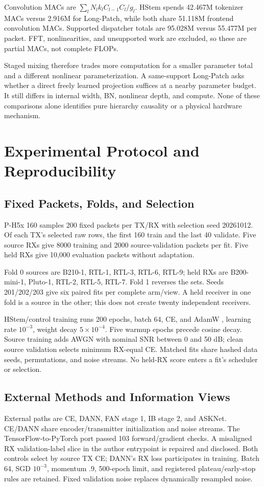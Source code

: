 \documentclass[journal]{IEEEtran}
\begin{document}
Convolution MACs are $\sum_lN_lk_lC_{l-1}C_l/g_l$. HStem spends 42.467M tokenizer MACs versus 2.916M for Long-Patch, while both share 51.118M frontend convolution MACs. Supported dispatcher totals are 95.028M versus 55.477M per packet. FFT, nonlinearities, and unsupported work are excluded, so these are partial MACs, not complete FLOPs.

Staged mixing therefore trades more computation for a smaller parameter total and a different nonlinear parameterization. A same-support Long-Patch asks whether a direct freely learned projection suffices at a nearby parameter budget. It still differs in internal width, BN, nonlinear depth, and compute. None of these comparisons alone identifies pure hierarchy causality or a physical hardware mechanism.


\section{Experimental Protocol and Reproducibility}
\subsection{Fixed Packets, Folds, and Selection}
P-H5x 160 samples 200 fixed packets per TX/RX with selection seed 20261012. Of each TX's selected raw rows, the first 160 train and the last 40 validate. Five source RXs give 8000 training and 2000 source-validation packets per fit. Five held RXs give 10,000 evaluation packets without adaptation.

Fold 0 sources are B210-1, RTL-1, RTL-3, RTL-6, RTL-9; held RXs are B200-mini-1, Pluto-1, RTL-2, RTL-5, RTL-7. Fold 1 reverses the sets. Seeds 201/202/203 give six paired fits per complete arm/view. A held receiver in one fold is a source in the other; this does not create twenty independent receivers.

HStem/control training runs 200 epochs, batch 64, CE, and AdamW \cite{loshchilov2019adamw}, learning rate $10^{-3}$, weight decay $5\times 10^{-4}$. Five warmup epochs precede cosine decay. Source training adds AWGN with nominal SNR between 0 and 50 dB; clean source validation selects minimum RX-equal CE. Matched fits share hashed data seeds, permutations, and noise streams. No held-RX score enters a fit's scheduler or selection.

\subsection{External Methods and Information Views}
External paths are CE, DANN, FAN stage 1, IB stage 2, and ASKNet. CE/DANN share encoder/transmitter initialization and noise streams. The TensorFlow-to-PyTorch port passed 103 forward/gradient checks. A misaligned RX validation-label slice in the author entrypoint is repaired and disclosed. Both controls select by source TX CE; DANN's RX loss participates in training. Batch 64, SGD $10^{-3}$, momentum .9, 500-epoch limit, and registered plateau/early-stop rules are retained. Fixed validation noise replaces dynamically resampled noise.
\end{document}
